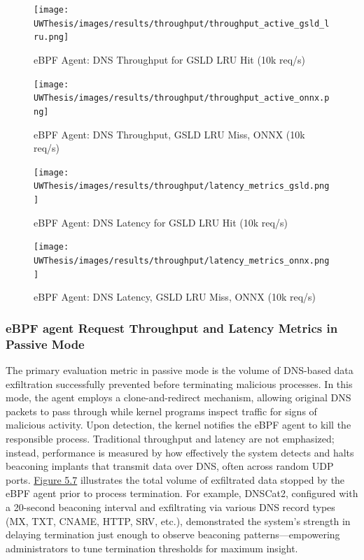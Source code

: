 \documentclass [11pt, proquest] {uwthesis}[2020/02/24]
\begin{document}
\begin{figure}[H]
  \centering
  \begin{minipage}[t]{0.47\textwidth}
    \centering
    \texttt{[image: UWThesis/images/results/throughput/throughput\_active\_gsld\_lru.png]}
    \caption{eBPF Agent: DNS Throughput for GSLD LRU Hit (10k req/s)}
    \label{fig:throughput_gsld}
  \end{minipage}
  \hfill
  \begin{minipage}[t]{0.47\textwidth}
    \centering
    \texttt{[image: UWThesis/images/results/throughput/throughput\_active\_onnx.png]}
    \caption{eBPF Agent: DNS Throughput, GSLD LRU Miss, ONNX (10k req/s)}
    \label{fig:throughput_onnx}
  \end{minipage}

  \vspace{1cm} %

  \begin{minipage}[t]{0.47\textwidth}
    \centering
    \texttt{[image: UWThesis/images/results/throughput/latency\_metrics\_gsld.png]}
    \caption{eBPF Agent: DNS Latency for GSLD LRU Hit (10k req/s)}
    \label{fig:latency_gsld}
  \end{minipage}
  \hfill
  \begin{minipage}[t]{0.47\textwidth}
    \centering
    \texttt{[image: UWThesis/images/results/throughput/latency\_metrics\_onnx.png]}
    \caption{eBPF Agent: DNS Latency, GSLD LRU Miss, ONNX (10k req/s)}
    \label{fig:latency_onnx}
  \end{minipage}
\end{figure}

\subsubsection{eBPF agent Request Throughput and Latency Metrics in Passive Mode}
The primary evaluation metric in passive mode is the volume of DNS-based data exfiltration successfully prevented before terminating malicious processes. In this mode, the agent employs a clone-and-redirect mechanism, allowing original DNS packets to pass through while kernel programs inspect traffic for signs of malicious activity. Upon detection, the kernel notifies the eBPF agent to kill the responsible process. Traditional throughput and latency are not emphasized; instead, performance is measured by how effectively the system detects and halts beaconing implants that transmit data over DNS, often across random UDP ports. \hyperref[fig:data_loss_prev]{Figure 5.7} illustrates the total volume of exfiltrated data stopped by the eBPF agent prior to process termination. For example, DNSCat2, configured with a 20-second beaconing interval and exfiltrating via various DNS record types (MX, TXT, CNAME, HTTP, SRV, etc.), demonstrated the system’s strength in delaying termination just enough to observe beaconing patterns—empowering administrators to tune termination thresholds for maximum insight.
\end{document}
